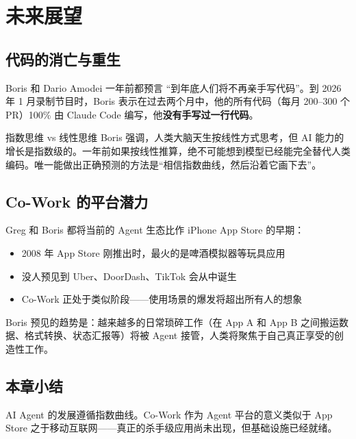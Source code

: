 \section{未来展望}

\subsection{代码的消亡与重生}

Boris 和 Dario Amodei 一年前都预言 ``到年底人们将不再亲手写代码''。到 2026 年 1 月录制节目时，Boris 表示在过去两个月中，他的所有代码（每月 200--300 个 PR）100\% 由 Claude Code 编写，他\textbf{没有手写过一行代码}。

\begin{knowledgebox}{指数思维 vs 线性思维}
Boris 强调，人类大脑天生按线性方式思考，但 AI 能力的增长是指数级的。一年前如果按线性推算，绝不可能想到模型已经能完全替代人类编码。唯一能做出正确预测的方法是``相信指数曲线，然后沿着它画下去''。
\end{knowledgebox}

\subsection{Co-Work 的平台潜力}

Greg 和 Boris 都将当前的 Agent 生态比作 iPhone App Store 的早期：

\begin{itemize}
    \item 2008 年 App Store 刚推出时，最火的是啤酒模拟器等玩具应用
    \item 没人预见到 Uber、DoorDash、TikTok 会从中诞生
    \item Co-Work 正处于类似阶段——使用场景的爆发将超出所有人的想象
\end{itemize}

Boris 预见的趋势是：越来越多的日常琐碎工作（在 App A 和 App B 之间搬运数据、格式转换、状态汇报等）将被 Agent 接管，人类将聚焦于自己真正享受的创造性工作。

\subsection{本章小结}

AI Agent 的发展遵循指数曲线。Co-Work 作为 Agent 平台的意义类似于 App Store 之于移动互联网——真正的杀手级应用尚未出现，但基础设施已经就绪。

